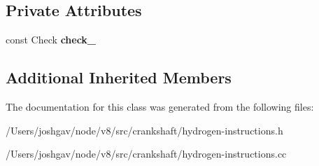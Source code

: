 \subsection*{Private Attributes}
\begin{DoxyCompactItemize}
\item 
const Check {\bfseries check\+\_\+}\hypertarget{classv8_1_1internal_1_1_h_check_instance_type_ad21f8ddf2b52b2ef75f1706b912bc76d}{}\label{classv8_1_1internal_1_1_h_check_instance_type_ad21f8ddf2b52b2ef75f1706b912bc76d}

\end{DoxyCompactItemize}
\subsection*{Additional Inherited Members}


The documentation for this class was generated from the following files\+:\begin{DoxyCompactItemize}
\item 
/\+Users/joshgav/node/v8/src/crankshaft/hydrogen-\/instructions.\+h\item 
/\+Users/joshgav/node/v8/src/crankshaft/hydrogen-\/instructions.\+cc\end{DoxyCompactItemize}

